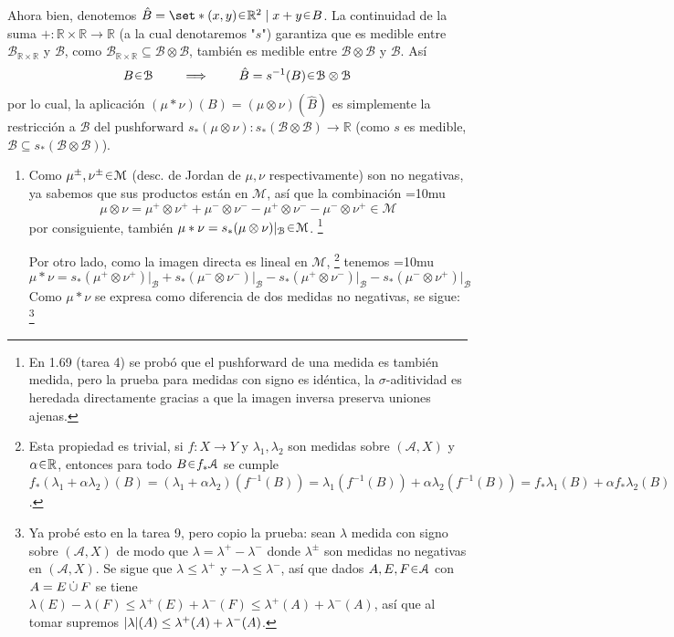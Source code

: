 \begin{sol}
Ahora bien, denotemos $\hat{B} = \set*{(x, y) \en \mathbb{R}^2 \mid x + y \en B}$. La continuidad de la suma $+ \colon \mathbb{R} \times \mathbb{R} \to \mathbb{R}$ (a la cual denotaremos "$s$") garantiza que es medible entre $\mathcal{B}_{\mathbb{R}\times\mathbb{R}}$ y $\mathcal{B}$, como $\mathcal{B}_{\mathbb{R}\times\mathbb{R}} \subseteq \mathcal{B} \otimes\mathcal{B}$, también es medible entre $\mathcal{B} \otimes \mathcal{B}$ y $\mathcal{B}$. Así
\[
B\en\mathcal{B}
\qquad\implies\qquad
\hat{B} = s^{-1}(B) \en \mathcal{B}\otimes\mathcal{B}
\]
por lo cual, la aplicación $(\mu*\nu)(B) = (\mu\otimes\nu)(\hat{B})$ es simplemente la restricción a $\mathcal{B}$ del pushforward $s_*(\mu\otimes\nu)\colon{s_*}(\mathcal{B}\otimes\mathcal{B}) \to \mathbb{R}$ (como $s$ es medible, $\mathcal{B} \subseteq {s_*}(\mathcal{B}\otimes\mathcal{B})$). 
\begin{enumerate}[label=(\roman*)]
\item %
Como $\mu^\pm,\nu^\pm\en\mathcal{M}$ (desc. de Jordan de $\mu,\nu$ respectivamente) son no negativas, ya sabemos que sus productos están en $\mathcal{M}$, así que la combinación 
{\thickmuskip=10mu
\[
\mu\otimes\nu 
= \mu^+ \otimes \nu^+ + \mu^- \otimes \nu^- - \mu^+ \otimes \nu^- - \mu^- \otimes \nu^+
\in \mathcal{M}
\]}%
por consiguiente, también $\mu*\nu= s_*(\mu\otimes\nu)|_{\mathcal{B}}\en\mathcal{M}$.%
\footnote{
En 1.69 (tarea 4) se probó que el pushforward de una medida es también medida, pero la prueba para medidas con signo es idéntica, la $\sigma$-aditividad es heredada directamente gracias a que la imagen inversa preserva uniones ajenas.
}\par
Por otro lado, como la imagen directa es lineal en $\mathcal{M}$,%
\footnote{
    Esta propiedad es trivial, si $f\colon X \to Y$ y $\lambda_1,\lambda_2$ son medidas sobre $(\mathcal{A},X)$ y $\alpha\en\mathbb{R}$, entonces para todo $B\en f_*\mathcal{A}$ se cumple $f_*(\lambda_1+\alpha\lambda_2)(B) = (\lambda_1+\alpha\lambda_2)(f^{-1}(B)) = \lambda_1(f^{-1}(B))+\alpha\lambda_2(f^{-1}(B)) = f_*\lambda_1(B) +\alpha f_*\lambda_2(B)$.
}
tenemos
{\thickmuskip=10mu
\[
\mu*\nu ={s_*(\mu^+ \otimes \nu^+)|_{\mathcal{B}}} + {s_*(\mu^- \otimes \nu^-)|_{\mathcal{B}}} - {s_*(\mu^+ \otimes \nu^-)|_{\mathcal{B}}} - s_*(\mu^- \otimes \nu^+)|_{\mathcal{B}}
\]}%
Como $\mu*\nu$ se expresa como diferencia de dos medidas no negativas, se sigue:%
\footnote{
    Ya probé esto en la tarea 9, pero copio la prueba: sean $\lambda$ medida con signo sobre $(\mathcal{A},X)$ de modo que $\lambda = \lambda^+- \lambda^-$ donde $\lambda^\pm$ son medidas no negativas en $(\mathcal{A},X)$. Se sigue que $\lambda \le \lambda^+$ y $-\lambda \le \lambda^-$, así que dados $A,E,F\en\mathcal{A}$ con $A = E \mathbin{\dot{\cup}} F$ se tiene $\lambda(E) - \lambda(F) \leq \lambda^+(E) + \lambda^-(F) \le \lambda^+(A) + \lambda^-(A)$, así que al tomar supremos $\abs{\lambda}(A) \le \lambda^+(A) + \lambda^-(A)$.
}
\end{enumerate}
\end{sol}
